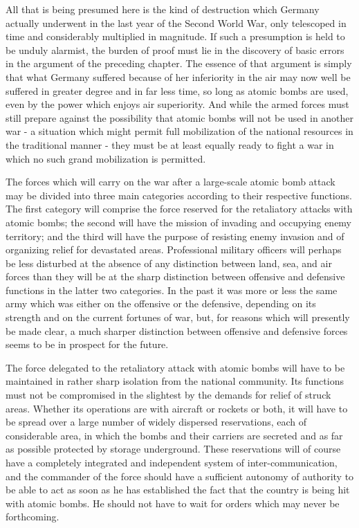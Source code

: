 All that is being presumed here is the kind of destruction which Germany actually underwent in the last year of the Second World War, only telescoped in time and considerably multiplied in magnitude. If such a presumption is held to be unduly alarmist, the burden of proof must lie in the discovery of basic errors in the argument of the preceding chapter. The essence of that argument is simply that what Germany suffered because of her inferiority in the air may now well be suffered in greater degree and in far less time, so long as atomic bombs are used, even by the power which enjoys air superiority. And while the armed forces must still prepare against the possibility that atomic bombs will not be used in another war - a situation which might permit full mobilization of the national resources in the traditional manner - they must be at least equally ready to fight a war in which no such grand mobilization is permitted.

The forces which will carry on the war after a large-scale atomic bomb attack may be divided into three main categories according to their respective functions. The first category will comprise the force reserved for the retaliatory attacks with atomic bombs; the second will have the mission of invading and occupying enemy territory; and the third will have the purpose of resisting enemy invasion and of organizing relief for devastated areas. Professional military officers will perhaps be less disturbed at the absence of any distinction between land, sea, and air forces than they will be at the sharp distinction between offensive and defensive functions in the latter two categories. In the past it was more or less the same army which was either on the offensive or the defensive, depending on its strength and on the current fortunes of war, but, for reasons which will presently be made clear, a much sharper distinction between offensive and defensive forces seems to be in prospect for the future.

The force delegated to the retaliatory attack with atomic bombs will have to be maintained in rather sharp isolation from the national community. Its functions must not be compromised in the slightest by the demands for relief of struck areas. Whether its operations are with aircraft or rockets or both, it will have to be spread over a large number of widely dispersed reservations, each of considerable area, in which the bombs and their carriers are secreted and as far as possible protected by storage underground. These reservations will of course have a completely integrated and independent system of inter-communication, and the commander of the force should have a sufficient autonomy of authority to be able to act as soon as he has established the fact that the country is being hit with atomic bombs. He should not have to wait for orders which may never be forthcoming.

